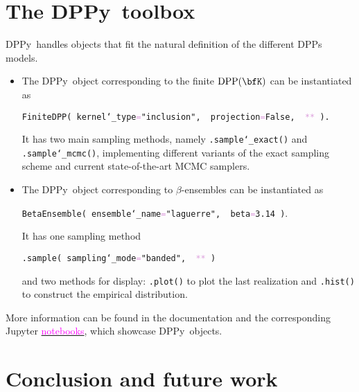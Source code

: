 \documentclass[twoside,11pt]{article}
\makeatletter
\newcommand{\DPPy}{\textsf{DPPy}}
\newcommand\DPP{\operatorname{DPP}}
\newcommand{\pygreen}[1]{\textcolor{OliveGreen}{#1}}
\newcommand{\pystr}[1]{\textcolor{BrickRed}{"#1"}}
\newcommand{\pylrcb}[1]{\string{#1\string}}
\newcommand{\pykwargs}{\textcolor{Plum}{**}}
\newcommand{\pyeq}{\textcolor{Plum}{=}}
\newcommand{\pyus}{\texttt{\char`_}}
\newcommand\footnoteref[1]{\protected@xdef\@thefnmark{\ref{#1}}\@footnotemark}
\newenvironment{nscenter}
 {\parskip=3pt\par\nopagebreak\centering}
 {\parskip=2pt\par\noindent\ignorespacesafterend}
\makeatother
\begin{document}


\section{The \DPPy\ toolbox} %
\label{sec:the_dppy_toolbox}

  \DPPy\ handles objects that fit the natural definition of the different DPPs models.
  \begin{itemize}
	  \item The \DPPy\ object corresponding to the finite $\DPP(\bfK)$ can be instantiated as
    \begin{nscenter}
      \texttt{FiniteDPP(%
        kernel\pyus type\pyeq\pystr{inclusion},\,%
        projection\pyeq\pygreen{False},\,%
        \pykwargs\pylrcb{%
          \pystr{K}:K}%
        ).}
    \end{nscenter}
		It has two main sampling methods, namely \texttt{.sample\pyus exact()} and \texttt{.sample\pyus mcmc()}, implementing different variants of the exact sampling scheme and current state-of-the-art MCMC samplers.

		\item The \DPPy\ object corresponding to $\beta$-ensembles can be instantiated as
    \begin{nscenter}
      \texttt{BetaEnsemble(%
        ensemble\pyus name\pyeq\pystr{laguerre},\,%
        beta\pyeq\pygreen{3.14}%
        )}.
    \end{nscenter}
		It has one sampling method
    \begin{nscenter}
      \texttt{.sample(%
        sampling\pyus mode\pyeq\pystr{banded},\,%
        \pykwargs\pylrcb{%
          \pystr{shape}:\pygreen{10},\,%
          \pystr{scale}:\pygreen{2.0},\,%
          \pystr{size}:\pygreen{50}}%
        )}
    \end{nscenter}
		and two methods for display: \texttt{.plot()} to plot the last realization and \texttt{.hist()} to construct the empirical distribution.
  \end{itemize}
  More information can be found in the documentation\footnoteref{fn:docs} and the corresponding Jupyter \href{https://github.com/guilgautier/DPPy/tree/master/notebooks}{\textcolor{magenta}{notebooks}}, which showcase \DPPy\ objects.


\section{Conclusion and future work} %
\label{sec:conclusion_and_future_work}
\end{document}

